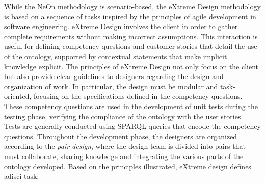 While the NeOn methodology is scenario-based, the eXtreme Design methodology \cite{presutti2009extreme} is based on a sequence of tasks inspired by the principles of agile development in software engineering. eXtreme Design involves the client in order to gather complete requirements without making incorrect assumptions. This interaction is useful for defining competency questions and customer stories that detail the use of the ontology, supported by contextual statements that make implicit knowledge explicit. The principles of eXtreme Design not only focus on the client but also provide clear guidelines to designers regarding the design and organization of work. In particular, the design must be modular and task-oriented, focusing on the specifications defined in the competency questions. These competency questions are used in the development of unit tests during the testing phase, verifying the compliance of the ontology with the user stories. Tests are generally conducted using SPARQL queries that encode the competency questions. Throughout the development phase, the designers are organized according to the \textit{pair design}, where the design team is divided into pairs that must collaborate, sharing knowledge and integrating the various parts of the ontology developed. Based on the principles illustrated, eXtreme design defines adisci task: 
